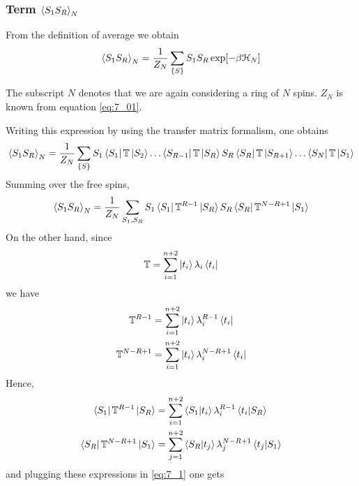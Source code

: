 \documentclass[../../Main/Main.tex]{subfiles}
\begin{document}
\subsubsection{Term \(\expval{S_1 S_R}_N\)}
\noindent From the definition of average we obtain
\begin{equation}
  \expval{S_1 S_R}_N = \frac{1}{Z_N} \sum_{\{ S \}  }^{} S_1 S_R \exp [-\beta \mathcal{H}_N]
\end{equation}
\begin{remark}
The subscript \( N \) denotes that we are again considering a ring of \( N \) spins. \( Z_N \) is known from equation \eqref{eq:7_01}.
\end{remark}
Writing this expression by using the transfer matrix formalism, one obtains
\begin{equation*}
\expval{S_1 S_R}_N  = \frac{1}{Z_N} \sum_{\{ S \}  }^{} S_1 \bra{S_1} \mathbb{T} \ket{S_2} \dots  \bra{S_{R-1}} \mathbb{T} \ket{S_R} S_R \bra{S_R} \mathbb{T} \ket{S_{R+1}} \dots \bra{S_N} \mathbb{T} \ket{S_1}
\end{equation*}
Summing over the free spins,
\begin{equation}
  \expval{S_1 S_R}_N = \frac{1}{Z_N} \sum_{S_1,S_R}^{} S_1 \bra{S_1} \mathbb{T}^{R-1} \ket{S_R} S_R \bra{S_R} \mathbb{T}^{N-R+1} \ket{S_1}
  \label{eq:7_1}
\end{equation}
On the other hand, since
\begin{equation*}
  \mathbb{T} = \sum_{i=1}^{n+2} \ket{t_i} \lambda _i  \bra{t_i}
\end{equation*}
we have
\begin{subequations}
\begin{align}
  \mathbb{T}^{R-1} &= \sum_{i=1}^{n+2} \ket{t_i} \lambda _i^{R-1}  \bra{t_i} \\
    \mathbb{T}^{N-R+1} &= \sum_{i=1}^{n+2} \ket{t_i} \lambda _i^{N-R+1}  \bra{t_i}
\end{align}
\end{subequations}
Hence,
\begin{subequations}
\begin{align}
  \bra{S_1} \mathbb{T}^{R-1} \ket{S_R} & = \sum_{i=1}^{n+2} \braket{S_1}{t_i} \lambda_i ^{R-1} \braket{t_i}{S_R} \\
  \bra{S_R} \mathbb{T}^{N-R+1} \ket{S_1} & = \sum_{j=1}^{n+2} \braket{S_R}{t_j} \lambda_j ^{N-R+1} \braket{t_j}{S_1}   
\end{align}
\end{subequations}
and plugging these expressions in  \eqref{eq:7_1} one gets
\end{document}
